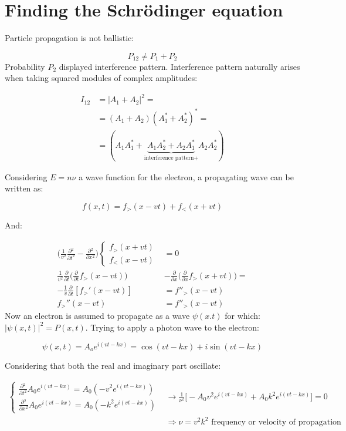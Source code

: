 \section{Finding the Schr\"odinger equation}
Particle propagation is not ballistic:

$$P_{12} \neq P_1 + P_2$$
\noindent
Probability $P_2$ displayed interference pattern.
Interference pattern naturally arises when taking squared modules of complex amplitudes:

\begin{align*}
  I_{12} &= |A_1 + A_2|^2=\\
         &=(A_1 + A_2)(A_1^*+A_2^*)^*=\\
         &=(A_1A_1^*+\underbrace{A_1A_2^*+A_2A_1^*}_{\text{interference pattern+}}A_2A_2^*)
\end{align*}


Considering $E=n\nu$ a wave function for the electron, a propagating wave can be written as:

$$f(x,t) = f_>(x-vt)+f_<(x+vt)$$

And:

\begin{align*}
  \biggl(\frac{1}{v^2}\frac{\partial {^2}}{\partial {t^2}}-\frac{\partial {^2}}{\partial {x^2}}\biggr)\begin{cases}f_>(x+vt)\\f_<(x-vt)\end{cases} &= 0\\
  \frac{1}{v^2}\frac{\partial {}}{\partial {t}}\biggl(\frac{\partial {}}{\partial {t}}f_>(x-vt)\biggr)&-\frac{\partial {}}{\partial {x}}\biggl(\frac{\partial {}}{\partial {x}}f_>(x+vt)\biggr)=\\
  -\frac{1}{v}\frac{\partial {}}{\partial {t}}[f_>'(x-vt)]&=f''_>(x-vt)\\
  f_>''(x-vt) &=f''_>(x-vt)
\end{align*}
\noindent
Now an electron is assumed to propagate as a wave $\psi(x.t)$ for which: $|\psi(x,t)|^2 = P(x,t)$.
Trying to apply a photon wave to the electron:

$$\psi(x,t) = A_oe^{i(vt-kx)} = \cos(vt-kx) + i\sin(vt - kx)$$

\noindent
Considering that both the real and imaginary part oscillate:

\begin{align*}
  \begin{cases}\frac{\partial {^2}}{\partial {t^2}}A_0e^{i(vt-kx)} = A_0(-v^2e^{i(vt-kx)})\\\frac{\partial {^2}}{\partial {x^2}}A_0e^{i(vt-kx)} = A_0(-k^2e^{i(vt-kx)})\end{cases}&\rightarrow \frac{1}{\nu^2}\biggl[-A_0v^2e^{i(vt-kx)}+A_0k^2e^{i(vt-kx)}\biggr] = 0\\
                                                                                                                                                                                  &\Rightarrow \nu = v^2k^2\text{ frequency or velocity of propagation}
\end{align*}

